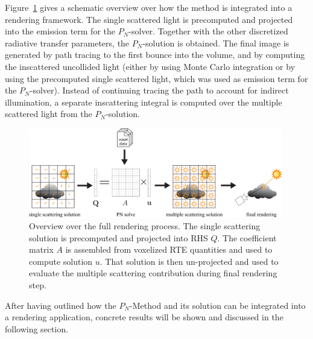 Figure~\ref{fig:pn_rendering_integration_overview} gives a schematic overview over how the method is integrated into a rendering framework. The single scattered light is precomputed and projected into the emission term for the $P_N$-solver. Together with the other discretized radiative transfer parameters, the $P_N$-solution is obtained. The final image is generated by path tracing to the first bounce into the volume, and by computing the inscattered uncollided light (either by using Monte Carlo integration or by using the precomputed single scattered light, which was used as emission term for the $P_N$-solver). Instead of continuing tracing the path to account for indirect illumination, a separate inscattering integral is computed over the multiple scattered light from the $P_N$-solution.

\begin{figure}[h]
\centering
\includegraphics[width=0.99\textwidth]{04_pn_method/figures/fig_rendering_pipeline.pdf}
\caption{Overview over the full rendering process. The single scattering solution is precomputed and projected into RHS $Q$. The coefficient matrix $A$ is assembled from voxelized RTE quantities and used to compute solution $u$. That solution is then un-projected and used to evaluate the multiple scattering contribution during final rendering step.}
\label{fig:pn_rendering_integration_overview}
\end{figure}

After having outlined how the $P_N$-Method and its solution can be integrated into a rendering application, concrete results will be shown and discussed in the following section.
